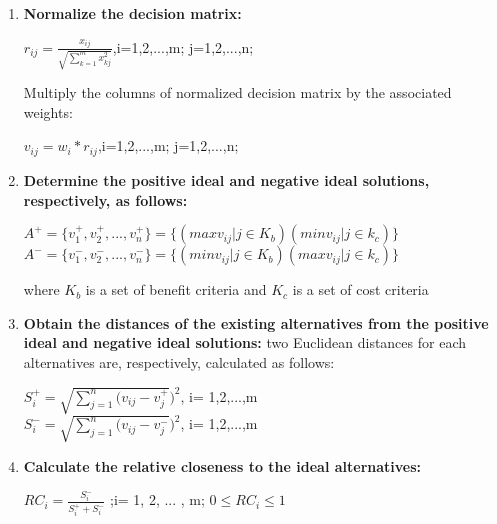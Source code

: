 \documentclass[12pt,a4paper]{article}
\begin{document}
\begin{enumerate}
    \item \textbf{Normalize the decision matrix:}
    \begin{center}

    $r_{ij}=\frac{x_{ij}}{\sqrt{\sum\limits^{m}_{k=1}x^{2}_{kj}}}$,i=1,2,...,m;  j=1,2,...,n;
    
    \end{center}
Multiply the columns of normalized decision matrix by the associated weights:

\begin{center}

$v_{ij} = w_{i} * r_{ij}$,i=1,2,...,m;  j=1,2,...,n;

\end{center}

\item \textbf{Determine the positive ideal and negative ideal solutions, respectively, as follows:}
\begin{center}
    $A^{+} = \{v^{+}_{1}, v^{+}_{2},...,v^{+}_{n}\} = \{(maxv_{ij}|j\in K_{b}) (minv_{ij}|j \in k_{c})\} $\\

    $A^{-} = \{v^{-}_{1}, v^{-}_{2},...,v^{-}_{n}\} = \{(minv_{ij}|j\in K_{b}) (maxv_{ij}|j \in k_{c})\} $

    
\end{center}

where $K_{b}$ is a set of benefit criteria and $K_{c}$ is a set of cost criteria

\item \textbf{Obtain the distances of the existing alternatives from the positive ideal and negative ideal solutions:} two Euclidean distances for each alternatives are, respectively, calculated as follows:
\begin{center}

$S_{i}^{+}=\sqrt{\sum\limits_{j=1}^{n}(v_{ij}-v_{j}^{+}})^{2}$, i= 1,2,...,m\\
   $S_{i}^{-}=\sqrt{\sum\limits_{j=1}^{n}(v_{ij}-v_{j}^{-}})^{2}$, i= 1,2,...,m 
\end{center}

\item \textbf{Calculate the relative closeness to the ideal alternatives:} 
\begin{center}

$RC_{i}=\frac{S_{i}^{-}}{S_{i}^{+}+S^{-}_{i}}$ ;i= 1, 2, ... , m; $0\leq RC_{i}\leq 1$    
\end{center}


\end{enumerate}
\end{document}
